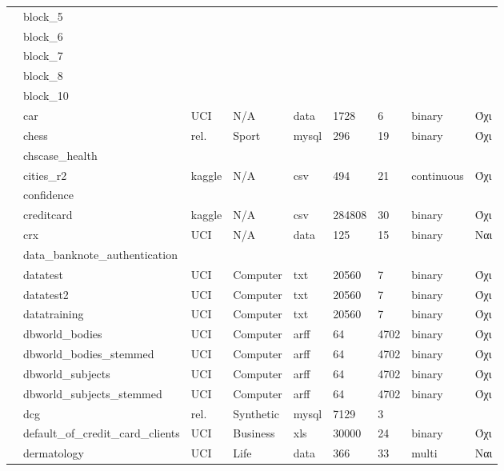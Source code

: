 {\begin{longtable}{|l| l| l | l | l | l |l | l | l | }
 			\rownumber & block\_5 & & & & & & & \\
 			\rownumber & block\_6 & & & & & & & \\
 			\rownumber & block\_7 & & & & & & & \\
 			\rownumber & block\_8 & & & & & & & \\
 			\rownumber & block\_10 & & & & & & & \\
 			\rownumber & car \citep{car} & UCI & N/A & data & 1728 & 6  & binary & Όχι\\
 			\rownumber & chess & rel. & Sport & mysql  & 296 & 19 & binary & Όχι \\
 			\rownumber & chscase\_health & & & & & & & \\
 			\rownumber & cities\_r2 \citep{indian} & kaggle & N/A & csv & 494 & 21 & continuous & Όχι \\
 			\rownumber & confidence & & & & & & & \\
 			\rownumber & creditcard \citep{creditcard,} & kaggle & N/A & csv & 284808 & 30 & binary & Όχι \\
 			\rownumber & crx \citep{credit}  & UCI & N/A & data & 125 & 15 & binary & Ναι \\
 			\rownumber & data\_banknote\_authentication & & & & & & & \\
 			\rownumber & datatest & UCI & Computer & txt & 20560 & 7 & binary & Όχι \\
 			\rownumber & datatest2 & UCI & Computer & txt & 20560 & 7 & binary & Όχι \\
 			\rownumber & datatraining & UCI & Computer & txt & 20560 & 7 & binary & Όχι \\
 			\rownumber & dbworld\_bodies & UCI & Computer & arff & 64 & 4702 & binary & Όχι \\
 			\rownumber & dbworld\_bodies\_stemmed & UCI & Computer & arff & 64 & 4702 & binary & Όχι \\
 			\rownumber & dbworld\_subjects & UCI & Computer & arff & 64 & 4702 & binary & Όχι \\
 			\rownumber & dbworld\_subjects\_stemmed & UCI & Computer & arff & 64 & 4702 & binary & Όχι \\
 			\rownumber & dcg \citep{dcg} & rel. & Synthetic & mysql & 7129 & 3 & & \\
 			\rownumber & default\_of\_credit\_card\_clients \citep{default} & UCI & Business & xls & 30000 & 24 & binary & Όχι \\
 			\rownumber & dermatology \citep{dermatology} & UCI & Life & data & 366 & 33 & multi & Ναι \\

\end{longtable}}
